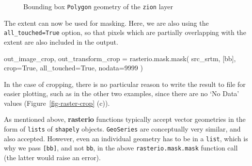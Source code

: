 \documentclass[
  letterpaper,
]{krantz}
\newenvironment{Shaded}{\begin{snugshade}}{\end{snugshade}}
\newcommand{\DecValTok}[1]{\textcolor[rgb]{0.68,0.00,0.00}{#1}}
\newcommand{\NormalTok}[1]{\textcolor[rgb]{0.00,0.23,0.31}{#1}}
\newcommand{\OperatorTok}[1]{\textcolor[rgb]{0.37,0.37,0.37}{#1}}
\newcommand{\VariableTok}[1]{\textcolor[rgb]{0.07,0.07,0.07}{#1}}
\begin{document}
\begin{figure}[H]


\caption{\label{fig-zion-bbox}Bounding box
\texttt{\textquotesingle{}Polygon\textquotesingle{}} geometry of the
\texttt{zion} layer}

\end{figure}%

The extent can now be used for masking. Here, we are also using the
\texttt{all\_touched=True} option, so that pixels which are partially
overlapping with the extent are also included in the output.

\begin{Shaded}
\begin{Highlighting}[]
\NormalTok{out\_image\_crop, out\_transform\_crop }\OperatorTok{=}\NormalTok{ rasterio.mask.mask(}
\NormalTok{    src\_srtm, }
\NormalTok{    [bb], }
\NormalTok{    crop}\OperatorTok{=}\VariableTok{True}\NormalTok{, }
\NormalTok{    all\_touched}\OperatorTok{=}\VariableTok{True}\NormalTok{, }
\NormalTok{    nodata}\OperatorTok{=}\DecValTok{9999}
\NormalTok{)}
\end{Highlighting}
\end{Shaded}

In the case of cropping, there is no particular reason to write the
result to file for easier plotting, such as in the other two examples,
since there are no `No Data' values (Figure~\ref{fig-raster-crop} (c)).

\begin{tcolorbox}[enhanced jigsaw, coltitle=black, colback=white, opacitybacktitle=0.6, rightrule=.15mm, titlerule=0mm, colbacktitle=quarto-callout-note-color!10!white, colframe=quarto-callout-note-color-frame, title=\textcolor{quarto-callout-note-color}{\faInfo}\hspace{0.5em}{Note}, left=2mm, breakable, arc=.35mm, bottomtitle=1mm, toptitle=1mm, bottomrule=.15mm, opacityback=0, leftrule=.75mm, toprule=.15mm]

As mentioned above, \textbf{rasterio} functions typically accept vector
geometries in the form of \texttt{lists} of \texttt{shapely} objects.
\texttt{GeoSeries} are conceptually very similar, and also accepted.
However, even an individual geometry has to be in a \texttt{list}, which
is why we pass \texttt{{[}bb{]}}, and not \texttt{bb}, in the above
\texttt{rasterio.mask.mask} function call (the latter would raise an
error).

\end{tcolorbox}
\end{document}
